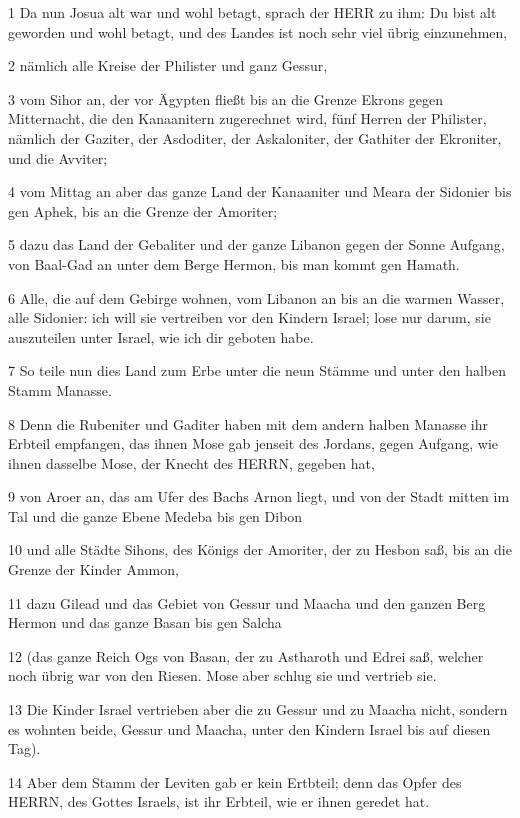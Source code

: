\par 1 Da nun Josua alt war und wohl betagt, sprach der HERR zu ihm: Du bist alt geworden und wohl betagt, und des Landes ist noch sehr viel übrig einzunehmen,
\par 2 nämlich alle Kreise der Philister und ganz Gessur,
\par 3 vom Sihor an, der vor Ägypten fließt bis an die Grenze Ekrons gegen Mitternacht, die den Kanaanitern zugerechnet wird, fünf Herren der Philister, nämlich der Gaziter, der Asdoditer, der Askaloniter, der Gathiter der Ekroniter, und die Avviter;
\par 4 vom Mittag an aber das ganze Land der Kanaaniter und Meara der Sidonier bis gen Aphek, bis an die Grenze der Amoriter;
\par 5 dazu das Land der Gebaliter und der ganze Libanon gegen der Sonne Aufgang, von Baal-Gad an unter dem Berge Hermon, bis man kommt gen Hamath.
\par 6 Alle, die auf dem Gebirge wohnen, vom Libanon an bis an die warmen Wasser, alle Sidonier: ich will sie vertreiben vor den Kindern Israel; lose nur darum, sie auszuteilen unter Israel, wie ich dir geboten habe.
\par 7 So teile nun dies Land zum Erbe unter die neun Stämme und unter den halben Stamm Manasse.
\par 8 Denn die Rubeniter und Gaditer haben mit dem andern halben Manasse ihr Erbteil empfangen, das ihnen Mose gab jenseit des Jordans, gegen Aufgang, wie ihnen dasselbe Mose, der Knecht des HERRN, gegeben hat,
\par 9 von Aroer an, das am Ufer des Bachs Arnon liegt, und von der Stadt mitten im Tal und die ganze Ebene Medeba bis gen Dibon
\par 10 und alle Städte Sihons, des Königs der Amoriter, der zu Hesbon saß, bis an die Grenze der Kinder Ammon,
\par 11 dazu Gilead und das Gebiet von Gessur und Maacha und den ganzen Berg Hermon und das ganze Basan bis gen Salcha
\par 12 (das ganze Reich Ogs von Basan, der zu Astharoth und Edrei saß, welcher noch übrig war von den Riesen. Mose aber schlug sie und vertrieb sie.
\par 13 Die Kinder Israel vertrieben aber die zu Gessur und zu Maacha nicht, sondern es wohnten beide, Gessur und Maacha, unter den Kindern Israel bis auf diesen Tag).
\par 14 Aber dem Stamm der Leviten gab er kein Ertbteil; denn das Opfer des HERRN, des Gottes Israels, ist ihr Erbteil, wie er ihnen geredet hat.

